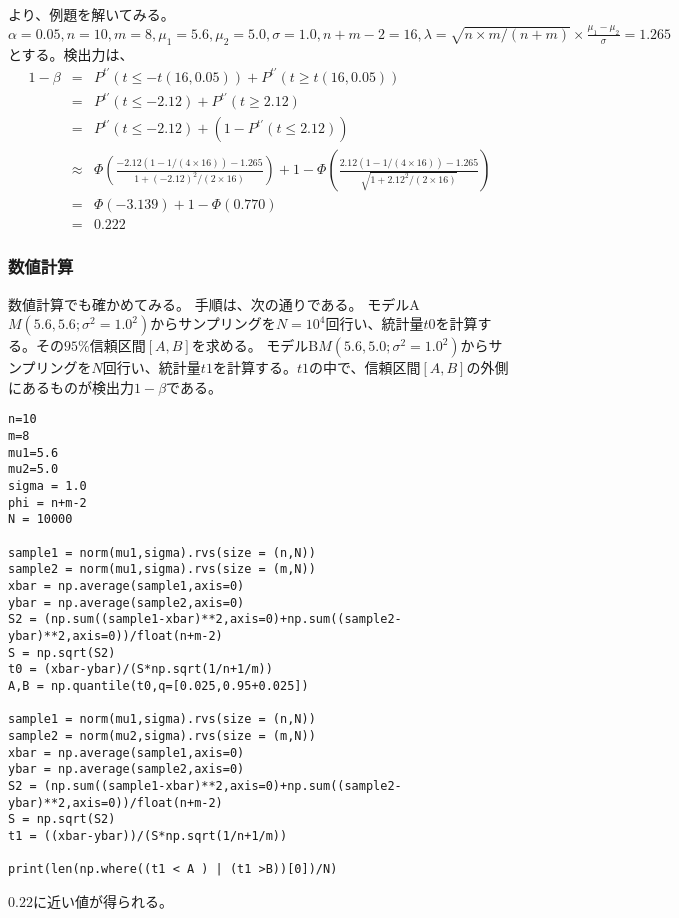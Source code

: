 \cite{2003サンプルサイズの決め方}より、例題を解いてみる。
$\alpha=0.05,n=10,m=8,\mu_1=5.6,\mu_2=5.0,\sigma=1.0,n+m-2 = 16,\lambda=\sqrt{n\times m/(n+m)} \times \frac{\mu_1-\mu_2}{\sigma} = 1.265 $とする。検出力は、
\begin{eqnarray*}
    1-\beta &=& P^{t'}(t \leq -t(16,0.05))+P^{t'}(t \geq t(16,0.05)) \\
    &=& P^{t'}(t \leq -2.12)+P^{t'}(t\geq 2.12) \\
    &=& P^{t'}(t \leq -2.12)+(1-P^{t'}(t\leq 2.12)) \\
    &\approx& \varPhi(\frac{-2.12(1-1/(4\times 16))-1.265}{1+(-2.12)^2/(2\times 16)}) +1-\varPhi(\frac{2.12(1-1/(4\times 16))-1.265}{\sqrt{1+2.12^2/(2\times 16)}}) \\
    &=& \varPhi(-3.139)+1-\varPhi(0.770) \\
    &=& 0.222
\end{eqnarray*}

\subsubsection*{数値計算}
数値計算でも確かめてみる。
手順は、次の通りである。
モデルA$M(5.6,5.6;\sigma^2=1.0^2)$からサンプリングを$N=10^4$回行い、統計量$t0$を計算する。その$95\%$信頼区間$[A,B]$を求める。
モデルB$M(5.6,5.0;\sigma^2=1.0^2)$からサンプリングを$N$回行い、統計量$t1$を計算する。$t1$の中で、信頼区間$[A,B]$の外側にあるものが検出力$1-\beta$である。

\begin{lstlisting}
n=10
m=8
mu1=5.6
mu2=5.0
sigma = 1.0
phi = n+m-2
N = 10000

sample1 = norm(mu1,sigma).rvs(size = (n,N))
sample2 = norm(mu1,sigma).rvs(size = (m,N))
xbar = np.average(sample1,axis=0)
ybar = np.average(sample2,axis=0)
S2 = (np.sum((sample1-xbar)**2,axis=0)+np.sum((sample2-ybar)**2,axis=0))/float(n+m-2)
S = np.sqrt(S2)
t0 = (xbar-ybar)/(S*np.sqrt(1/n+1/m))
A,B = np.quantile(t0,q=[0.025,0.95+0.025])

sample1 = norm(mu1,sigma).rvs(size = (n,N))
sample2 = norm(mu2,sigma).rvs(size = (m,N))
xbar = np.average(sample1,axis=0)
ybar = np.average(sample2,axis=0)
S2 = (np.sum((sample1-xbar)**2,axis=0)+np.sum((sample2-ybar)**2,axis=0))/float(n+m-2)
S = np.sqrt(S2)
t1 = ((xbar-ybar))/(S*np.sqrt(1/n+1/m))

print(len(np.where((t1 < A ) | (t1 >B))[0])/N)    
\end{lstlisting}
$0.22$に近い値が得られる。



